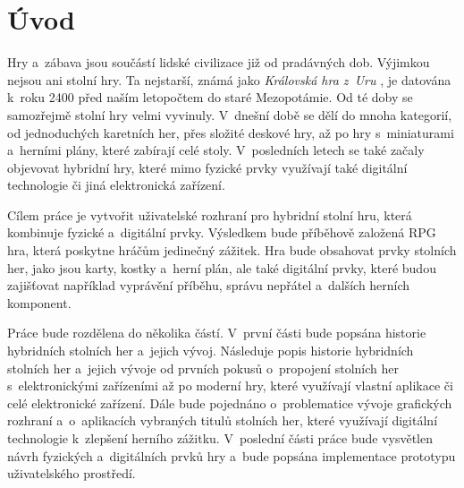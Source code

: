 \chapter{Úvod}
Hry a~zábava jsou součástí lidské civilizace již od pradávných dob. Výjimkou nejsou ani stolní hry. Ta nejstarší, známá jako \textit{Královská hra z~Uru} \cite{royal_game_of_ur}, je datována k~roku 2400 před naším letopočtem do staré Mezopotámie. Od té doby se samozřejmě stolní hry velmi vyvinuly. V~dnešní době se dělí do mnoha kategorií, od jednoduchých karetních her, přes složité deskové hry, až po hry s~miniaturami a~herními plány, které zabírají celé stoly. V~posledních letech se také začaly objevovat hybridní hry, které mimo fyzické prvky využívají také digitální technologie či jiná elektronická zařízení.

Cílem práce je vytvořit uživatelské rozhraní pro hybridní stolní hru, která kombinuje fyzické a~digitální prvky. Výsledkem bude příběhově založená RPG hra, která poskytne hráčům jedinečný zážitek. Hra bude obsahovat prvky stolních her, jako jsou karty, kostky a~herní plán, ale také digitální prvky, které budou zajišťovat například vyprávění příběhu, správu nepřátel a~dalších herních komponent.

Práce bude rozdělena do několika částí. V~první části bude popsána historie hybridních stolních her a~jejich vývoj. Následuje popis historie hybridních stolních her a~jejich vývoje od prvních pokusů o~propojení stolních her s~elektronickými zařízeními až po moderní hry, které využívají vlastní aplikace či celé elektronické zařízení. Dále bude pojednáno o~problematice vývoje grafických rozhraní a~o~aplikacích vybraných titulů stolních her, které využívají digitální technologie k~zlepšení herního zážitku. V~poslední části práce bude vysvětlen návrh fyzických a~digitálních prvků hry a~bude popsána implementace prototypu uživatelského prostředí.